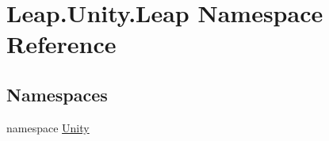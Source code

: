 \hypertarget{namespace_leap_1_1_unity_1_1_leap}{}\section{Leap.\+Unity.\+Leap Namespace Reference}
\label{namespace_leap_1_1_unity_1_1_leap}
\subsection*{Namespaces}
\begin{DoxyCompactItemize}
\item 
namespace \mbox{\hyperlink{namespace_leap_1_1_unity_1_1_leap_1_1_unity}{Unity}}
\end{DoxyCompactItemize}
